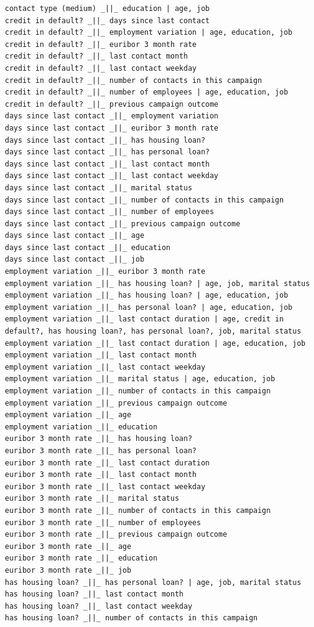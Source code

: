 \documentclass[11pt]{article}
\begin{document}
{\begin{verbatim}
contact type (medium) _||_ education | age, job
credit in default? _||_ days since last contact
credit in default? _||_ employment variation | age, education, job
credit in default? _||_ euribor 3 month rate
credit in default? _||_ last contact month
credit in default? _||_ last contact weekday
credit in default? _||_ number of contacts in this campaign
credit in default? _||_ number of employees | age, education, job
credit in default? _||_ previous campaign outcome
days since last contact _||_ employment variation
days since last contact _||_ euribor 3 month rate
days since last contact _||_ has housing loan?
days since last contact _||_ has personal loan?
days since last contact _||_ last contact month
days since last contact _||_ last contact weekday
days since last contact _||_ marital status
days since last contact _||_ number of contacts in this campaign
days since last contact _||_ number of employees
days since last contact _||_ previous campaign outcome
days since last contact _||_ age
days since last contact _||_ education
days since last contact _||_ job
employment variation _||_ euribor 3 month rate
employment variation _||_ has housing loan? | age, job, marital status
employment variation _||_ has housing loan? | age, education, job
employment variation _||_ has personal loan? | age, education, job
employment variation _||_ last contact duration | age, credit in default?, has housing loan?, has personal loan?, job, marital status
employment variation _||_ last contact duration | age, education, job
employment variation _||_ last contact month
employment variation _||_ last contact weekday
employment variation _||_ marital status | age, education, job
employment variation _||_ number of contacts in this campaign
employment variation _||_ previous campaign outcome
employment variation _||_ age
employment variation _||_ education
euribor 3 month rate _||_ has housing loan?
euribor 3 month rate _||_ has personal loan?
euribor 3 month rate _||_ last contact duration
euribor 3 month rate _||_ last contact month
euribor 3 month rate _||_ last contact weekday
euribor 3 month rate _||_ marital status
euribor 3 month rate _||_ number of contacts in this campaign
euribor 3 month rate _||_ number of employees
euribor 3 month rate _||_ previous campaign outcome
euribor 3 month rate _||_ age
euribor 3 month rate _||_ education
euribor 3 month rate _||_ job
has housing loan? _||_ has personal loan? | age, job, marital status
has housing loan? _||_ last contact month
has housing loan? _||_ last contact weekday
has housing loan? _||_ number of contacts in this campaign

\end{verbatim}}
\end{document}
